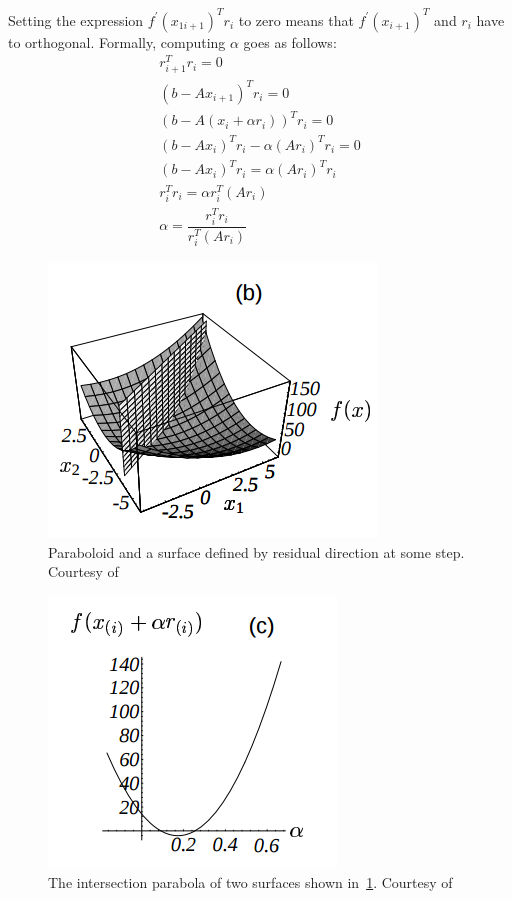 \documentclass[en]{minipw} %
\begin{document}
Setting the expression $f^{'}(x_{1i+1})^{T} r_i$ to zero means that $f^{'}(x_{i+1})^{T}$ and  $r_i$ have to orthogonal.
Formally, computing $\alpha$ goes as follows:
\begin{equation}
\begin{aligned}
r^{T}_{i+1}r_{i} = 0
\\
(b - Ax_{i+1})^{T}r_{i} = 0
\\
(b - A(x_{i} + \alpha r_{i}))^{T}r_{i} = 0
\\
(b - Ax_{i})^{T}r_{i} - \alpha (Ar_{i})^{T}r_{i}= 0
\\
(b - Ax_{i})^{T}r_{i} = \alpha (Ar_{i})^{T}r_{i}
\\
r_{i}^{T}r_{i} = \alpha r_{i}^{T} (Ar_{i})
\\
\alpha = \dfrac{r_{i}^{T}r_{i}}{r_{i}^{T} (Ar_{i})}
\end{aligned}
\end{equation}

\begin{figure}[h!]
\centering
\includegraphics[scale=0.8]{pictures/alpha1.png}
\caption[Paraboloid and surface]{Paraboloid and a surface defined by residual direction at some step. Courtesy of~\cite{cg}}
\label{fig:cg_alpha1}
\end{figure}

\begin{figure}[h!]
\centering
\includegraphics[scale=0.8]{pictures/alpha2.png}
\caption[Intersection of paraboloid and surface]{The intersection parabola of two surfaces shown in~\ref{fig:cg_alpha1}. Courtesy of~\cite{cg}}
\label{fig:cg_alpha2}
\end{figure}
\end{document}
